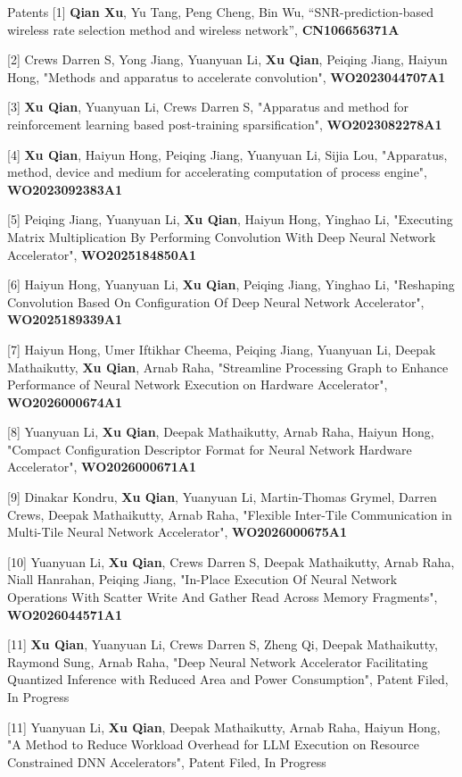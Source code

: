 \documentclass{resume} %
\begin{document}
\begin{rSection}{Patents}{}
[1] \textbf{Qian Xu}, Yu Tang, Peng Cheng, Bin Wu, ``SNR-prediction-based wireless rate selection method and wireless network'', \textbf{CN106656371A}

[2] Crews Darren S, Yong Jiang, Yuanyuan Li, \textbf{Xu Qian}, Peiqing Jiang, Haiyun Hong, "Methods and apparatus to accelerate convolution", \textbf{WO2023044707A1}

[3] \textbf{Xu Qian}, Yuanyuan Li, Crews Darren S, "Apparatus and method for reinforcement learning based post-training sparsification", \textbf{WO2023082278A1}

[4] \textbf{Xu Qian}, Haiyun Hong, Peiqing Jiang, Yuanyuan Li, Sijia Lou, "Apparatus, method, device and medium for accelerating computation of process engine", \textbf{WO2023092383A1}

[5] Peiqing Jiang, Yuanyuan Li, \textbf{Xu Qian}, Haiyun Hong, Yinghao Li, "Executing Matrix Multiplication By Performing Convolution With Deep Neural Network Accelerator", \textbf{WO2025184850A1}

[6] Haiyun Hong, Yuanyuan Li, \textbf{Xu Qian}, Peiqing Jiang, Yinghao Li, "Reshaping Convolution Based On Configuration Of Deep Neural Network Accelerator", \textbf{WO2025189339A1}

[7] Haiyun Hong, Umer Iftikhar Cheema, Peiqing Jiang, Yuanyuan Li, Deepak Mathaikutty, \textbf{Xu Qian}, Arnab Raha, "Streamline Processing Graph to Enhance Performance of Neural Network Execution on Hardware Accelerator", \textbf{WO2026000674A1}

[8] Yuanyuan Li, \textbf{Xu Qian}, Deepak Mathaikutty, Arnab Raha, Haiyun Hong, "Compact Configuration Descriptor Format for Neural Network Hardware Accelerator", \textbf{WO2026000671A1}

[9] Dinakar Kondru, \textbf{Xu Qian}, Yuanyuan Li, Martin-Thomas Grymel, Darren Crews, Deepak Mathaikutty, Arnab Raha, "Flexible Inter-Tile Communication in Multi-Tile Neural Network Accelerator", \textbf{WO2026000675A1}

[10] Yuanyuan Li, \textbf{Xu Qian}, Crews Darren S, Deepak Mathaikutty, Arnab Raha, Niall Hanrahan, Peiqing Jiang, "In-Place Execution Of Neural Network Operations With Scatter Write And Gather Read Across Memory Fragments", \textbf{WO2026044571A1}

[11] \textbf{Xu Qian}, Yuanyuan Li, Crews Darren S, Zheng Qi, Deepak Mathaikutty, Raymond Sung, Arnab Raha, "Deep Neural Network Accelerator Facilitating Quantized Inference with Reduced Area and Power Consumption", Patent Filed, In Progress

[11] Yuanyuan Li, \textbf{Xu Qian}, Deepak Mathaikutty, Arnab Raha, Haiyun Hong, "A Method to Reduce Workload Overhead for LLM Execution on Resource Constrained DNN Accelerators", Patent Filed, In Progress
\end{rSection}
\end{document}
